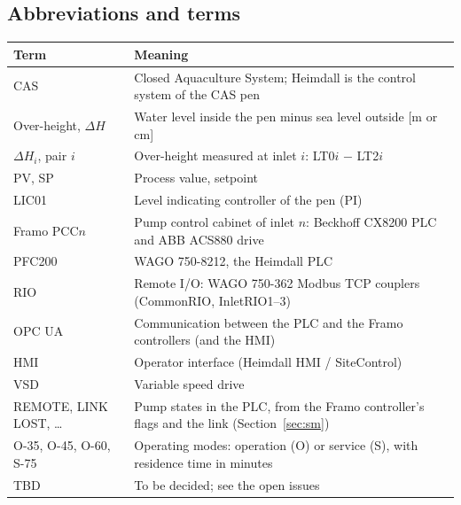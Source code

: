 \documentclass[11pt,a4paper]{article}
\begin{document}
\subsection{Abbreviations and terms}
\begin{small}
\begin{tabularx}{\textwidth}{@{}P{26mm}L@{}}
\toprule
Term & Meaning \\
\midrule
CAS & Closed Aquaculture System; Heimdall is the control system of the CAS pen \\
Over-height, $\Delta H$ & Water level inside the pen minus sea level outside [m or cm] \\
$\Delta H_i$, pair $i$ & Over-height measured at inlet $i$: LT0$i$ $-$ LT2$i$ \\
PV, SP & Process value, setpoint \\
LIC01 & Level indicating controller of the pen (PI) \\
Framo PCC$n$ & Pump control cabinet of inlet $n$: Beckhoff CX8200 PLC and ABB ACS880 drive \\
PFC200 & WAGO 750-8212, the Heimdall PLC \\
RIO & Remote I/O: WAGO 750-362 Modbus TCP couplers (CommonRIO, InletRIO1--3) \\
OPC UA & Communication between the PLC and the Framo controllers (and the HMI) \\
HMI & Operator interface (Heimdall HMI / SiteControl) \\
VSD & Variable speed drive \\
REMOTE, LINK LOST, \ldots & Pump states in the PLC, from the Framo controller's flags and the link (Section~\ref{sec:sm}) \\
O-35, O-45, O-60, S-75 & Operating modes: operation (O) or service (S), with residence time in minutes \\
TBD & To be decided; see the open issues \\
\bottomrule
\end{tabularx}
\end{small}
\end{document}
